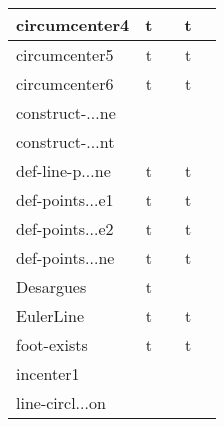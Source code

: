 {\begin{longtable}{|l|*{2}{cr|}}
\cellcolor{blue!10}circumcenter4 
& \cellcolor{green!40}t & \cellcolor{green!40}{\bf 64} 
& \cellcolor{green!30}t & \cellcolor{green!30}{\sl 240} 
\\ \hline
\cellcolor{blue!10}circumcenter5 
& \cellcolor{green!40}t & \cellcolor{green!40}{\bf 54} 
& \cellcolor{green!30}t & \cellcolor{green!30}{\sl 244} 
\\ \hline
\cellcolor{blue!10}circumcenter6 
& \cellcolor{green!40}t & \cellcolor{green!40}{\bf 103} 
& \cellcolor{green!30}t & \cellcolor{green!30}{\sl 276} 
\\ \hline
\cellcolor{blue!10}construct-$\ldots$ne 
& \cellcolor{yellow!25} & \cellcolor{yellow!25}{ 16} 
& \cellcolor{yellow!25} & \cellcolor{yellow!25}{ 232} 
\\ \hline
\cellcolor{blue!10}construct-$\ldots$nt 
& \cellcolor{yellow!25} & \cellcolor{yellow!25}{ 10} 
& \cellcolor{yellow!25} & \cellcolor{yellow!25}{ 233} 
\\ \hline
\cellcolor{blue!10}def-line-p$\ldots$ne 
& \cellcolor{green!50}t & \cellcolor{green!50}{\bf 39} 
& \cellcolor{green!30}t & \cellcolor{green!30}{\sl 250} 
\\ \hline
\cellcolor{blue!10}def-points$\ldots$e1 
& \cellcolor{green!40}t & \cellcolor{green!40}{\bf 59} 
& \cellcolor{green!30}t & \cellcolor{green!30}{\sl 265} 
\\ \hline
\cellcolor{blue!10}def-points$\ldots$e2 
& \cellcolor{green!40}t & \cellcolor{green!40}{\bf 51} 
& \cellcolor{green!30}t & \cellcolor{green!30}{\sl 263} 
\\ \hline
\cellcolor{blue!10}def-points$\ldots$ne 
& \cellcolor{green!50}t & \cellcolor{green!50}{\bf 38} 
& \cellcolor{green!30}t & \cellcolor{green!30}{\sl 236} 
\\ \hline
\cellcolor{blue!10}Desargues 
& \cellcolor{green!40}t & \cellcolor{green!40}{\bf 55} 
& \cellcolor{yellow!25} & \cellcolor{yellow!25}{ 3129} 
\\ \hline
\cellcolor{blue!10}EulerLine 
& \cellcolor{green!50}t & \cellcolor{green!50}{\bf 48} 
& \cellcolor{green!30}t & \cellcolor{green!30}{\sl 271} 
\\ \hline
\cellcolor{blue!10}foot-exists 
& \cellcolor{green!50}t & \cellcolor{green!50}{\bf 36} 
& \cellcolor{green!30}t & \cellcolor{green!30}{\sl 242} 
\\ \hline
\cellcolor{blue!10}incenter1 
& \cellcolor{yellow!25} & \cellcolor{yellow!25}{ 4} 
& \cellcolor{yellow!25} & \cellcolor{yellow!25}{ 241} 
\\ \hline
\cellcolor{blue!10}line-circl$\ldots$on 

\end{longtable}}

